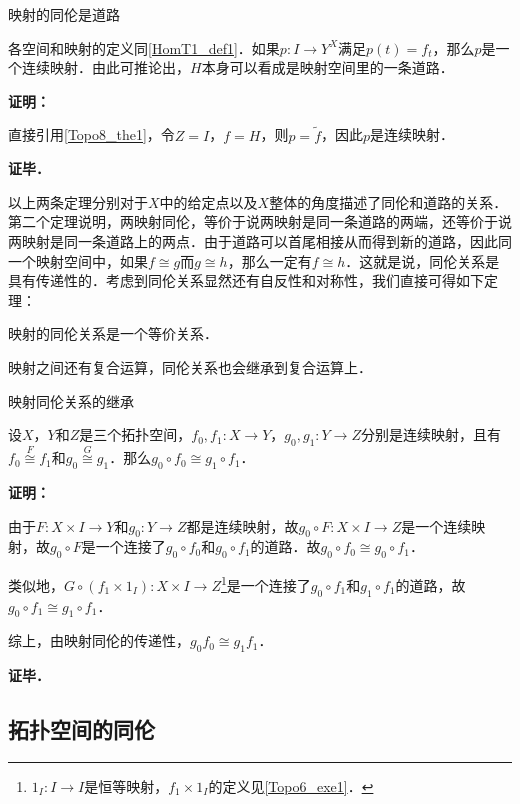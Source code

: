 \begin{theorem}{映射的同伦是道路}

各空间和映射的定义同\autoref{HomT1_def1}．如果$p:I\rightarrow Y^X$满足$p(t)=f_t$，那么$p$是一个连续映射．由此可推论出，$H$本身可以看成是映射空间里的一条道路．

\end{theorem}

\textbf{证明：}

直接引用\autoref{Topo8_the1}，令$Z=I$，$f=H$，则$p=\widetilde{f}$，因此$p$是连续映射．

\textbf{证毕．}

以上两条定理分别对于$X$中的给定点以及$X$整体的角度描述了同伦和道路的关系．第二个定理说明，两映射同伦，等价于说两映射是同一条道路的两端，还等价于说两映射是同一条道路上的两点．由于道路可以首尾相接从而得到新的道路，因此同一个映射空间中，如果$f\cong g$而$g\cong h$，那么一定有$f\cong h$．这就是说，同伦关系是具有传递性的．考虑到同伦关系显然还有自反性和对称性，我们直接可得如下定理：

\begin{theorem}{}
映射的同伦关系是一个等价关系．
\end{theorem}

映射之间还有复合运算，同伦关系也会继承到复合运算上．

\begin{theorem}{映射同伦关系的继承}

设$X$，$Y$和$Z$是三个拓扑空间，$f_0, f_1:X\rightarrow Y$，$g_0, g_1:Y\rightarrow Z$分别是连续映射，且有$f_0\overset{F}{\cong}f_1$和$g_0\overset{G}{\cong}g_1$．那么$g_0\circ f_0\cong g_1\circ f_1$．

\end{theorem}

\textbf{证明：}

由于$F:X\times I\rightarrow Y$和$g_0:Y\rightarrow Z$都是连续映射，故$g_0\circ F:X\times I\rightarrow Z$是一个连续映射，故$g_0\circ F$是一个连接了$g_0\circ f_0$和$g_0\circ f_1$的道路．故$g_0\circ f_0\cong g_0\circ f_1$．

类似地，$G\circ(f_1\times 1_I):X\times I\rightarrow Z$\footnote{$1_I:I\rightarrow I$是恒等映射，$f_1\times 1_I$的定义见\autoref{Topo6_exe1}．}是一个连接了$g_0\circ f_1$和$g_1\circ f_1$的道路，故$g_0\circ f_1\cong g_1\circ f_1$．

综上，由映射同伦的传递性，$g_0f_0\cong g_1f_1$．

\textbf{证毕．}

\subsection{拓扑空间的同伦}

